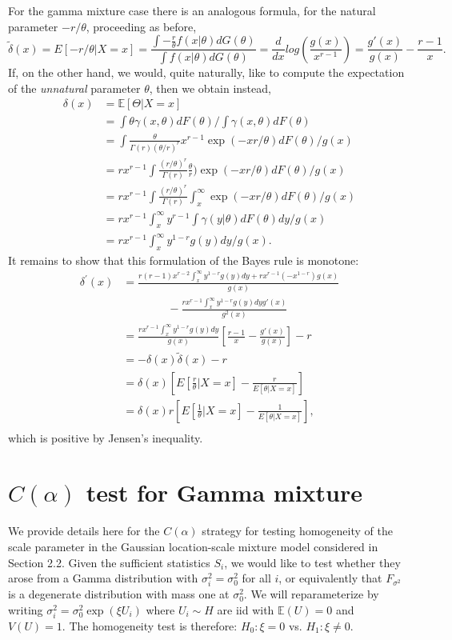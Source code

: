 \documentclass[12pt]{amsart}
\def\EB{\mathbb{E}}
\begin{document}
{For the gamma mixture case there is an analogous formula, for the 
natural parameter $-r/\theta$, proceeding as before, 
\[
\tilde{\delta}(x)=E[-r/\theta | X=x]
= \frac{\int -\frac{r}{\theta}f(x|\theta)dG(\theta)} {\int f(x|\theta)dG(\theta)}
=\frac{d}{dx}log(\frac{g(x)}{x^{r-1}})
=\frac{g'(x)}{g(x)}-\frac{r-1}{x}.
\]
If, on the other hand, we would, quite naturally, like to compute the
expectation of the {\it unnatural} parameter $\theta$, then we obtain instead,
\begin{align*}
\delta (x) & =  \EB [ \Theta | X = x]\\
&= \int \theta \gamma(x,\theta) dF (\theta) / \int  \gamma(x,\theta) dF (\theta)\\
&= \int \frac{\theta}{\Gamma(r) (\theta /r)^r} x^{r-1} 
\exp( - x r / \theta ) dF (\theta) / g(x) \\
&= r x^{r-1} \int \frac{(r/\theta)^r}{\Gamma(r)} \frac{\theta}{r}) 
\exp( - x r / \theta ) dF (\theta) / g(x) \\
&= r x^{r-1} \int \frac{(r/\theta)^r}{\Gamma(r)} \int_x^\infty 
\exp( - x r / \theta ) dF (\theta) / g(x) \\
&= r x^{r-1} \int_x^\infty y^{r-1} \int \gamma(y|\theta) dF (\theta) dy /g(x) \\
&= r x^{r-1} \int_{x}^{\infty}y^{1-r}g(y)dy /g(x).
\end{align*}
It remains to show that this formulation of the Bayes rule is monotone:
\begin{align*}
\delta^\prime (x)&=\frac{r(r-1)x^{r-2}\int_{x}^{\infty}y^{1-r}g(y)dy+rx^{r-1}(-x^{1-r})g(x)}{g(x)}\\
& \qquad \qquad -\frac{rx^{r-1}\int_{x}^{\infty}y^{1-r}g(y)dy g'(x)}{g^{2}(x)}\\
&=\frac{r x^{r-1}\int_{x}^{\infty}y^{1-r}g(y)dy}{g(x)}\left [\frac{r-1}{x}-\frac{g'(x)}{g(x)}\right ]-r\\
&=- \delta(x)\tilde{\delta}(x)-r\\
&=\delta(x)\left [E[\frac{r}{\theta}|X=x]-\frac{r}{E[\theta|X=x]}\right ]\\
&=\delta(x) r\left [E[\frac{1}{\theta}|X=x]-\frac{1}{E[\theta|X=x]}\right ],\\
\end{align*}
which is positive by Jensen's inequality.


\section{ $C(\alpha)$ test for Gamma mixture}
We provide details here for the $C(\alpha)$ strategy for testing homogeneity of the scale 
parameter in the Gaussian location-scale mixture model considered in Section 2.2. 
Given the sufficient statistics $S_{i}$, we would like to test whether they arose from a
Gamma distribution with $\sigma_{i}^{2} = \sigma_{0}^{2}$ for all $i$, or equivalently 
that $F_{\sigma^{2}}$ is a degenerate distribution with mass one at $\sigma_{0}^{2}$. 
We will reparameterize by writing $\sigma_{i}^{2}= \sigma_{0}^{2} \exp (\xi U_{i})$ where 
$U_{i} \sim H$ are iid with $\mathbb{E}(U)=0$ and $V(U)=1$. The homogeneity test is 
therefore: $H_{0}: \xi =0$ vs. $H_{1}: \xi  \neq 0$. \\

}
\end{document}
